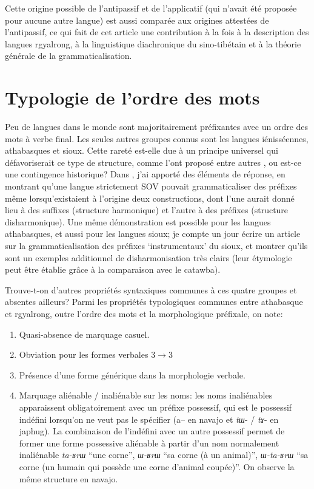 \documentclass[oldfontcommands,oneside,a4paper,11pt]{memoir}
\begin{document}
Cette origine possible de l'antipassif et de l'applicatif (qui n'avait   été proposée pour aucune autre langue) est aussi comparée aux origines attestées de l'antipassif, ce qui fait de cet article une contribution à la fois à la description des langues rgyalrong, à la linguistique diachronique du sino-tibétain et à la théorie générale de la grammaticalisation.


\section{Typologie de l'ordre des mots} \label{sec:ordre}

Peu de langues dans le monde sont majoritairement préfixantes avec un ordre des mots à verbe final. Les seules autres groupes connus sont les langues iénisséennes, athabasques et sioux.  Cette rareté est-elle due à un principe universel qui défavoriserait ce type de structure, comme l'ont proposé entre autres \citet{hawkins88prefixing}, ou est-ce une contingence historique? Dans \citet{jacques13harmonization}, j'ai apporté des éléments de réponse, en montrant qu'une langue strictement SOV pouvait grammaticaliser des préfixes même lorsqu'existaient à l'origine deux constructions, dont l'une aurait donné lieu à des suffixes (structure harmonique) et l'autre à des préfixes (structure disharmonique). Une même démonstration est possible pour les langues athabasques, et aussi pour les langues sioux; je compte un jour écrire un article sur la grammaticalisation des préfixes `instrumentaux' du sioux, et montrer qu'ils sont un exemples additionnel de disharmonisation très clairs (leur étymologie peut être établie grâce à la comparaison avec le catawba).


Trouve-t-on d'autres propriétés syntaxiques communes à ces quatre groupes  et absentes ailleurs?  Parmi les propriétés typologiques communes entre athabasque et rgyalrong, outre l'ordre des mots et la morphologique préfixale, on note:

 \begin{enumerate}
\item Quasi-absence de marquage casuel.

\item Obviation pour les formes verbales 3$\rightarrow$3

\item Présence d'une forme générique dans la morphologie verbale.

\item Marquage aliénable / inaliénable sur les noms: les noms inaliénables apparaissent obligatoirement avec un préfixe possessif, qui est le possessif indéfini lorsqu'on ne veut pas le spécifier (a-- en navajo et \textit{tɯ}- / \textit{tɤ}- en japhug). La combinaison de l'indéfini avec un autre possessif permet de former une forme possessive aliénable à partir d'un nom normalement inaliénable \textit{ta-ʁrɯ} ``une corne'', \textit{ɯ-ʁrɯ} ``sa corne (à un animal)'', \textit{ɯ-ta-ʁrɯ} ``sa corne (un humain qui possède une corne d'animal coupée)''. On observe la même structure en navajo.
\end{enumerate}
\end{document}
